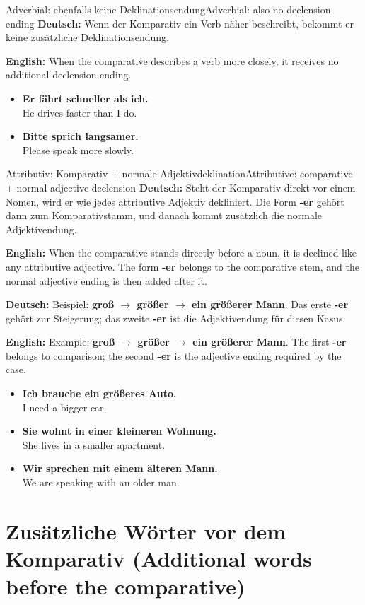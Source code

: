 \documentclass[a4paper,11pt]{article}
\newcommand{\GermanText}[1]{\textbf{Deutsch: }#1\par}
\newcommand{\EnglishText}[1]{{\small\color{SoftGray}\textbf{English: }#1\par}}
\newcommand{\ExampleItem}[2]{\item \textbf{#1}\\{\small\color{SoftGray}#2}}
\begin{document}
\begin{grammarentry}{Adverbial: ebenfalls keine Deklinationsendung}{Adverbial: also no declension ending}
\GermanText{Wenn der Komparativ ein Verb näher beschreibt, bekommt er keine zusätzliche Deklinationsendung.}
\EnglishText{When the comparative describes a verb more closely, it receives no additional declension ending.}
\end{grammarentry}

\begin{exbox}
\begin{itemize}
\ExampleItem{Er fährt schneller als ich.}{He drives faster than I do.}
\ExampleItem{Bitte sprich langsamer.}{Please speak more slowly.}
\end{itemize}
\end{exbox}

\begin{grammarentry}{Attributiv: Komparativ + normale Adjektivdeklination}{Attributive: comparative + normal adjective declension}
\GermanText{Steht der Komparativ direkt vor einem Nomen, wird er wie jedes attributive Adjektiv dekliniert. Die Form \textbf{-er} gehört dann zum Komparativstamm, und danach kommt zusätzlich die normale Adjektivendung.}
\EnglishText{When the comparative stands directly before a noun, it is declined like any attributive adjective. The form \textbf{-er} belongs to the comparative stem, and the normal adjective ending is then added after it.}

\GermanText{Beispiel: \textbf{groß $\rightarrow$ größer $\rightarrow$ ein größerer Mann}. Das erste \textbf{-er} gehört zur Steigerung; das zweite \textbf{-er} ist die Adjektivendung für diesen Kasus.}
\EnglishText{Example: \textbf{groß $\rightarrow$ größer $\rightarrow$ ein größerer Mann}. The first \textbf{-er} belongs to comparison; the second \textbf{-er} is the adjective ending required by the case.}
\end{grammarentry}

\begin{exbox}
\begin{itemize}
\ExampleItem{Ich brauche ein größeres Auto.}{I need a bigger car.}
\ExampleItem{Sie wohnt in einer kleineren Wohnung.}{She lives in a smaller apartment.}
\ExampleItem{Wir sprechen mit einem älteren Mann.}{We are speaking with an older man.}
\end{itemize}
\end{exbox}

\section{Zusätzliche Wörter vor dem Komparativ \textnormal{(Additional words before the comparative)}}
\end{document}
